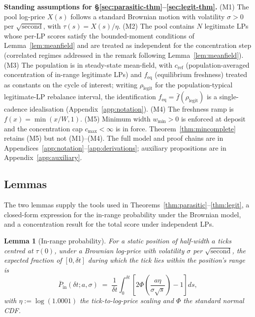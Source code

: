 \documentclass[11pt,a4paper]{article}
\theoremstyle{definition}
\theoremstyle{plain}
\newtheorem{lemma}{Lemma}
\theoremstyle{remark}
\begin{document}
\textbf{Standing assumptions for \S\ref{sec:parasitic-thm}--\ref{sec:legit-thm}.} (M1) The pool log-price $X(s)$ follows a standard Brownian motion with volatility $\sigma > 0$ per $\sqrt{\text{second}}$, with $\tau(s) = X(s)/\eta$. (M2) The pool contains $N$ legitimate LPs whose per-LP scores satisfy the bounded-moment conditions of Lemma~\ref{lem:meanfield} and are treated as independent for the concentration step (correlated regimes addressed in the remark following Lemma~\ref{lem:meanfield}). (M3) The population is in steady-state mean-field, with $c_{\text{ref}}$ (population-averaged concentration of in-range legitimate LPs) and $f_{\text{eq}}$ (equilibrium freshness) treated as constants on the cycle of interest; writing $\rho_{\text{legit}}$ for the population-typical legitimate-LP rebalance interval, the identification $f_{\text{eq}} = \bar f(\rho_{\text{legit}})$ is a single-cadence idealisation (Appendix~\ref{app:notation}). (M4) The freshness ramp is $f(x) = \min(x/W, 1)$. (M5) Minimum width $w_{\min} > 0$ is enforced at deposit and the concentration cap $c_{\max} < \infty$ is in force. Theorem~\ref{thm:mincomplete} retains (M5) but not (M1)--(M4). The full model and proof chains are in Appendices~\ref{app:notation}--\ref{app:derivations}; auxiliary propositions are in Appendix~\ref{app:auxiliary}.

\subsection{Lemmas}\label{sec:lemmas}

The two lemmas supply the tools used in Theorems~\ref{thm:parasitic}--\ref{thm:legit}, a closed-form expression for the in-range probability under the Brownian model, and a concentration result for the total score under independent LPs.

\begin{lemma}[In-range probability]\label{lem:pin}
For a static position of half-width $a$ ticks centred at $\tau(0)$, under a Brownian log-price with volatility $\sigma$ per $\sqrt{\text{second}}$, the expected fraction of $[0, \delta t]$ during which the tick lies within the position's range is
\begin{equation}\label{eq:pin}
\bar P_{\text{in}}(\delta t; a, \sigma) \;=\; \frac{1}{\delta t} \int_0^{\delta t} \left[2\Phi\!\left(\frac{a\eta}{\sigma\sqrt{s}}\right) - 1\right] ds,
\end{equation}
with $\eta := \log(1.0001)$ the tick-to-log-price scaling and $\Phi$ the standard normal CDF.
\end{lemma}
\end{document}
